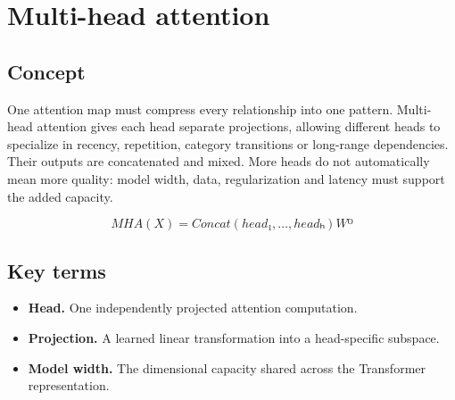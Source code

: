 \section{Multi-head attention}

\begin{abstract}
Several attention subspaces can represent different transition patterns at once.
\end{abstract}

\subsection{Concept}
One attention map must compress every relationship into one pattern. Multi-head attention gives each head separate projections, allowing different heads to specialize in recency, repetition, category transitions or long-range dependencies. Their outputs are concatenated and mixed. More heads do not automatically mean more quality: model width, data, regularization and latency must support the added capacity.

\begin{equation*}
MHA(X) = Concat(head₁, …, headₕ)Wᴼ
\end{equation*}

\subsection{Key terms}
\begin{itemize}
\item \textbf{Head.} One independently projected attention computation.
\item \textbf{Projection.} A learned linear transformation into a head-specific subspace.
\item \textbf{Model width.} The dimensional capacity shared across the Transformer representation.
\end{itemize}
